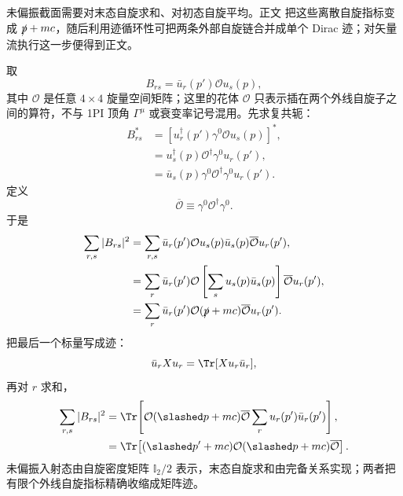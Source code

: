 \begin{derivation}

未偏振截面需要对末态自旋求和、对初态自旋平均。正文 把这些离散自旋指标变成 $\slashed p+mc$，随后利用迹循环性可把两条外部自旋链合并成单个 Dirac 迹；对矢量流执行这一步便得到正文。



取
\begin{equation*}
 B_{rs}=\bar u_r(p')\mathcal O u_s(p),
\end{equation*}
其中 $\mathcal O$ 是任意 $4\times4$ 旋量空间矩阵；这里的花体 $\mathcal O$ 只表示插在两个外线自旋子之间的算符，不与 1PI 顶角 $\Gamma^\mu$ 或衰变率记号混用。先求复共轭：
\begin{align*}
 B_{rs}^*
 &=[u_r^\dagger(p')\gamma^0\mathcal O u_s(p)]^*,\\
 &=u_s^\dagger(p)\mathcal O^\dagger\gamma^0u_r(p'),\\
 &=\bar u_s(p)\gamma^0\mathcal O^\dagger\gamma^0u_r(p').
\end{align*}
定义
\begin{equation*}
 \overline{\mathcal O}\equiv\gamma^0\mathcal O^\dagger\gamma^0.
\end{equation*}
于是
\begin{align*}
 \sum_{r,s}|B_{rs}|^2
 &=\sum_{r,s}
 \bar u_r(p')\mathcal O u_s(p)
 \bar u_s(p)\overline{\mathcal O} u_r(p'),\\
 &=\sum_r\bar u_r(p')\mathcal O
 \left[\sum_su_s(p)\bar u_s(p)\right]
 \overline{\mathcal O} u_r(p'),\\
 &=\sum_r\bar u_r(p')\mathcal O(\slashed p+mc)
 \overline{\mathcal O} u_r(p').
\end{align*}
把最后一个标量写成迹：
\begin{equation*}
 \bar u_r X u_r=\Tr[Xu_r\bar u_r],
\end{equation*}
再对 $r$ 求和，
\begin{align*}
 \sum_{r,s}|B_{rs}|^2
 &=\Tr\!\left[
 \mathcal O(\slashed p+mc)\overline{\mathcal O}
 \sum_ru_r(p')\bar u_r(p')
 \right],\\
 &={
 \Tr\!\left[(\slashed p'+mc)\mathcal O
 (\slashed p+mc)\overline{\mathcal O}\right].}
 \end{align*}
未偏振入射态由自旋密度矩阵 $\mathbb I_2/2$ 表示，末态自旋求和由完备关系实现；两者把有限个外线自旋指标精确收缩成矩阵迹。


\end{derivation}
